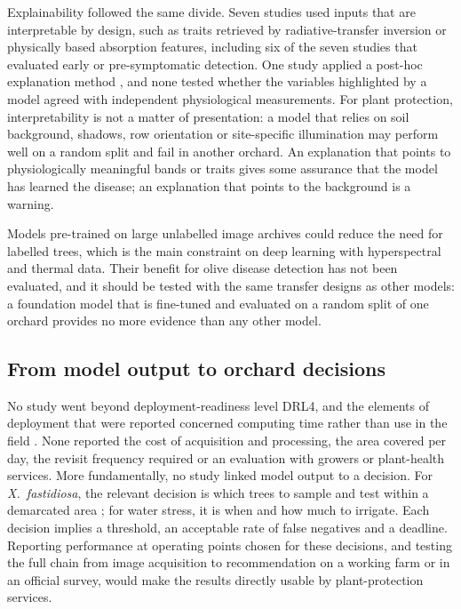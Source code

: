 \documentclass[preprint,12pt]{elsarticle}
\begin{document}
Explainability followed the same divide. Seven studies used inputs that are interpretable by design, such as traits retrieved by radiative-transfer inversion or physically based absorption features, including six of the seven studies that evaluated early or pre-symptomatic detection. One study applied a post-hoc explanation method \citep{u106}, and none tested whether the variables highlighted by a model agreed with independent physiological measurements. For plant protection, interpretability is not a matter of presentation: a model that relies on soil background, shadows, row orientation or site-specific illumination may perform well on a random split and fail in another orchard. An explanation that points to physiologically meaningful bands or traits gives some assurance that the model has learned the disease; an explanation that points to the background is a warning.

Models pre-trained on large unlabelled image archives could reduce the need for labelled trees, which is the main constraint on deep learning with hyperspectral and thermal data. Their benefit for olive disease detection has not been evaluated, and it should be tested with the same transfer designs as other models: a foundation model that is fine-tuned and evaluated on a random split of one orchard provides no more evidence than any other model.

\subsection{From model output to orchard decisions}\label{sec:disc_deployment}
No study went beyond deployment-readiness level DRL4, and the elements of deployment that were reported concerned computing time rather than use in the field \citep{u013,u021,u055}. None reported the cost of acquisition and processing, the area covered per day, the revisit frequency required or an evaluation with growers or plant-health services. More fundamentally, no study linked model output to a decision. For \textit{X.~fastidiosa}, the relevant decision is which trees to sample and test within a demarcated area \citep{eu2020xylella}; for water stress, it is when and how much to irrigate. Each decision implies a threshold, an acceptable rate of false negatives and a deadline. Reporting performance at operating points chosen for these decisions, and testing the full chain from image acquisition to recommendation on a working farm or in an official survey, would make the results directly usable by plant-protection services.
\end{document}
